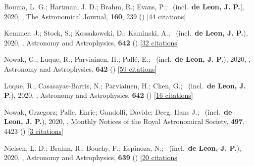 \item[{\color{numcolor}\scriptsize29}] Bouma, L. G.; Hartman, J. D.; Brahm, R.; Evans, P.; \etal\ (incl.\ \textbf{de Leon, J. P.}), 2020, , The Astronomical Journal, \textbf{160}, 239 () [\href{https://ui.adsabs.harvard.edu/abs/2020AJ....160..239B}{44 citations}]

\item[{\color{numcolor}\scriptsize28}] Kemmer, J.; Stock, S.; Kossakowski, D.; Kaminski, A.; \etal\ (incl.\ \textbf{de Leon, J. P.}), 2020, , Astronomy and Astrophysics, \textbf{642} () [\href{https://ui.adsabs.harvard.edu/abs/2020A&A...642A.236K}{32 citations}]

\item[{\color{numcolor}\scriptsize27}] Nowak, G.; Luque, R.; Parviainen, H.; Pall{\'e}, E.; \etal\ (incl.\ \textbf{de Leon, J. P.}), 2020, , Astronomy and Astrophysics, \textbf{642} () [\href{https://ui.adsabs.harvard.edu/abs/2020A&A...642A.173N}{59 citations}]

\item[{\color{numcolor}\scriptsize26}] Luque, R.; Casasayas-Barris, N.; Parviainen, H.; Chen, G.; \etal\ (incl.\ \textbf{de Leon, J. P.}), 2020, , Astronomy and Astrophysics, \textbf{642} () [\href{https://ui.adsabs.harvard.edu/abs/2020A&A...642A..50L}{16 citations}]

\item[{\color{numcolor}\scriptsize25}] Nowak, Grzegorz; Palle, Enric; Gandolfi, Davide; Deeg, Hans J.; \etal\ (incl.\ \textbf{de Leon, J. P.}), 2020, , Monthly Notices of the Royal Astronomical Society, \textbf{497}, 4423 () [\href{https://ui.adsabs.harvard.edu/abs/2020MNRAS.497.4423N}{3 citations}]

\item[{\color{numcolor}\scriptsize24}] Nielsen, L. D.; Brahm, R.; Bouchy, F.; Espinoza, N.; \etal\ (incl.\ \textbf{de Leon, J. P.}), 2020, , Astronomy and Astrophysics, \textbf{639} () [\href{https://ui.adsabs.harvard.edu/abs/2020A&A...639A..76N}{20 citations}]

